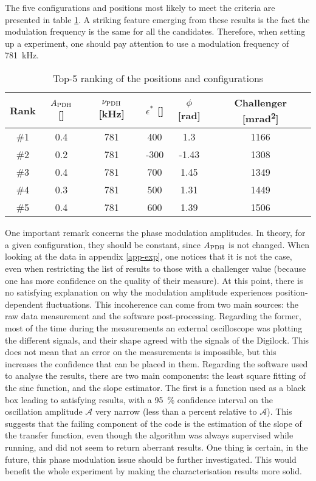 The five configurations and positions most likely to meet the criteria are presented in table \ref{ranking}. A striking feature emerging from these results is the fact the \pdh modulation frequency is the same for all the candidates. Therefore, when setting up a \rcer experiment, one should pay attention to use a \pdh modulation frequency of \SI{781}{\kilo\hertz}.

\begin{table}[h]
	\centering
	\begin{tabular}{|c|c|c|c|c|c|}
		\hline
		Rank & $A_{\text{PDH}}$ [\si{\voltptp}] & $\nu_{\text{PDH}}$ [\si{\kilo\hertz}] & $\epsilon^*$ [\si{\au}] & $\phi$ [\si{\radian}] & Challenger [\si{\milli\radian\squared}]\\
		\hline
		\hline
		\#1 & 0.4 & 781 & 400 & 1.3 & 1166\\
		\#2 & 0.2 & 781 & -300 & -1.43 & 1308\\
		\#3 & 0.4 & 781 & 700 & 1.45 & 1349\\
		\#4 & 0.3 & 781 & 500 & 1.31 & 1449\\
		\#5 & 0.4 & 781 & 600 & 1.39 & 1506\\
		\hline
	\end{tabular}
	\caption{Top-5 ranking of the positions and configurations}
	\label{ranking}
\end{table}

One important remark concerns the phase modulation amplitudes. In theory, for a given configuration, they should be constant, since $A_{\text{PDH}}$ is not changed. When looking at the data in appendix \ref{app-exp}, one notices that it is not the case, even when restricting the list of results to those with a challenger value (because one has more confidence on the quality of their measure). At this point, there is no satisfying explanation on why the modulation amplitude experiences position-dependent fluctuations. This incoherence can come from two main sources: the raw data measurement and the software post-processing. Regarding the former, most of the time during the measurements an external oscilloscope was plotting the different signals, and their shape agreed with the signals of the Digilock. This does not mean that an error on the measurements is impossible, but this increases the confidence that can be placed in them. Regarding the software used to analyse the results, there are two main components: the least square fitting of the sine function, and the slope estimator. The first is a function used as a black box leading to satisfying results, with a \SI{95}{\percent} confidence interval on the oscillation amplitude $\mathcal{A}$ very narrow (less than a percent relative to $\mathcal{A}$). This suggests that the failing component of the code is the estimation of the slope of the transfer function, even though the algorithm was always supervised while running, and did not seem to return aberrant results. One thing is certain, in the future, this phase modulation issue should be further investigated. This would benefit the whole experiment by making the characterisation results more solid.





